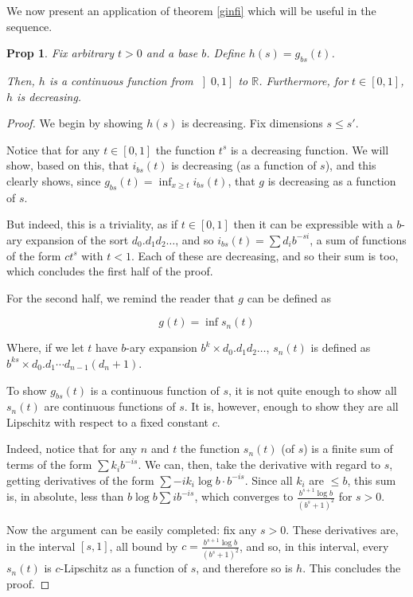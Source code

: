 \documentclass[11pt]{amsart}
\newcommand{\R}{\mathbb{R}}
\newtheorem{prop}{Prop}
\begin{document}
We now present an application of theorem \ref{ginfi} which will be useful in the sequence.

\begin{prop} \label{gfuncofs}
Fix arbitrary $t > 0$ and a base $b$. Define $h(s) = g_{bs}(t)$.

Then, $h$ is a continuous function from $\left]0, 1 \right]$ to $\R$. Furthermore, for $t \in \left[0, 1 \right]$, $h$ is decreasing.
\end{prop}

\begin{proof}
We begin by showing $h(s)$ is decreasing. Fix dimensions $s \leq s'$.

Notice that for any $t \in \left[0, 1 \right]$ the function $t^s$ is a decreasing function. We will show, based on this, that $i_{bs}(t)$ is decreasing (as a function of $s$), and this clearly shows, since $g_{bs}(t) = \inf_{x \geq t} i_{bs}(t)$, that $g$ is decreasing as a function of $s$.

But indeed, this is a triviality, as if $t \in \left[0, 1\right]$ then it can be expressible with a $b$-ary expansion of the sort $d_0 . d_1 d_2 \dots$, and so $i_{bs}(t) = \sum d_i b^{-si}$, a sum of functions of the form $c t^s$ with $t < 1$. Each of these are decreasing, and so their sum is too, which concludes the first half of the proof.

For the second half, we remind the reader that $g$ can be defined as

\[g(t) = \inf s_n(t)\]

Where, if we let $t$ have $b$-ary expansion $b^k \times d_0 . d_1 d_2 \dots$, $s_n(t)$ is defined as $b^{ks} \times d_0 . d_1 \cdots d_{n-1} (d_n + 1)$.

To show $g_{bs}(t)$ is a continuous function of $s$, it is not quite enough to show all $s_n(t)$ are continuous functions of $s$. It is, however, enough to show they are all Lipschitz with respect to a fixed constant $c$.

Indeed, notice that for any $n$ and $t$ the function $s_n(t)$ (of $s$) is a finite sum of terms of the form $\sum k_i b^{-is}$.  We can, then, take the derivative with regard to $s$, getting derivatives of the form $\sum - i k_i \log b \cdot b^{-is}$. Since all $k_i$ are $\leq b$, this sum is, in absolute, less than $b \log b \sum i b^{-is}$, which converges to $\frac{b^{s+1} \log b}{(b^s + 1)^2}$ for $s > 0$.

Now the argument can be easily completed: fix any $s > 0$. These derivatives are, in the interval $\left[s, 1 \right]$, all bound by $c = \frac{b^{s+1} \log b}{(b^s + 1)^2}$, and so, in this interval, every $s_n(t)$ is $c$-Lipschitz as a function of $s$, and therefore so is $h$. This concludes the proof.
\end{proof}
\end{document}
